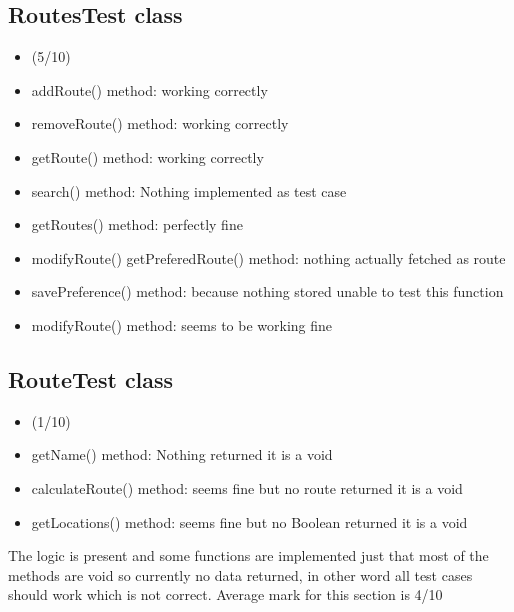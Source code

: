 \documentclass[12pt]{article}
\begin{document}
\subsection {RoutesTest class}
\begin{itemize}
\item (5/10)
\item addRoute() method: working correctly
\item removeRoute() method: working correctly
\item getRoute() method: working correctly
\item search() method: Nothing implemented as test case
\item getRoutes() method: perfectly fine
\item modifyRoute() getPreferedRoute() method: nothing actually fetched as route
\item savePreference() method: because nothing stored unable to test this function
\item modifyRoute() method: seems to be working fine
\end{itemize}

\subsection {RouteTest class}
\begin{itemize}
\item (1/10)
\item getName() method: Nothing returned it is a void
\item calculateRoute() method: seems fine but no route returned it is a void
\item getLocations() method: seems fine but no Boolean returned it is a void
\end{itemize} 

\begin{flushleft}
The logic is present and some functions are implemented just that most of the methods are void so
currently no data returned, in other word all test cases should work which is not correct. Average mark
for this section is 4/10
\end{flushleft}
\end{document}
